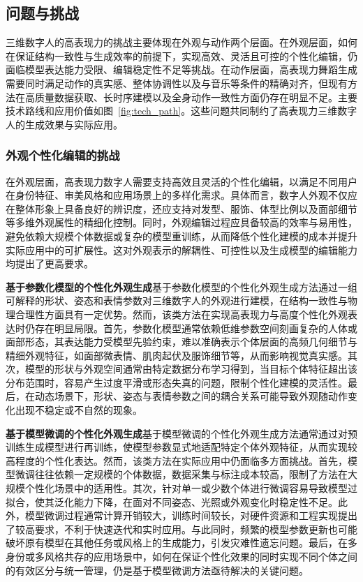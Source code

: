 \subsection{问题与挑战}

三维数字人的高表现力的挑战主要体现在外观与动作两个层面。在外观层面，如何在保证结构一致性与生成效率的前提下，实现高效、灵活且可控的个性化编辑，仍面临模型表达能力受限、编辑稳定性不足等挑战。在动作层面，高表现力舞蹈生成需要同时满足动作的真实感、整体协调性以及与音乐等条件的精确对齐，但现有方法在高质量数据获取、长时序建模以及全身动作一致性方面仍存在明显不足。主要技术路线和应用价值如图~\ref{fig:tech_path}。这些问题共同制约了高表现力三维数字人的生成效果与实际应用。


\subsubsection{外观个性化编辑的挑战} 在外观层面，高表现力数字人需要支持高效且灵活的个性化编辑，以满足不同用户在身份特征、审美风格和应用场景上的多样化需求。具体而言，数字人外观不仅应在整体形象上具备良好的辨识度，还应支持对发型、服饰、体型比例以及面部细节等多维外观属性的精细化控制。同时，外观编辑过程应具备较高的效率与易用性，避免依赖大规模个体数据或复杂的模型重训练，从而降低个性化建模的成本并提升实际应用中的可扩展性。这对外观表示的解耦性、可控性以及生成模型的编辑能力均提出了更高要求。

\noindent\textbf{基于参数化模型的个性化外观生成}\quad 基于参数化模型的个性化外观生成方法通过一组可解释的形状、姿态和表情参数对三维数字人的外观进行建模，在结构一致性与物理合理性方面具有一定优势。然而，该类方法在实现高表现力与高度个性化外观表达时仍存在明显局限。首先，参数化模型通常依赖低维参数空间刻画复杂的人体或面部形态，其表达能力受模型先验约束，难以准确表示个体层面的高频几何细节与精细外观特征，如面部微表情、肌肉起伏及服饰细节等，从而影响视觉真实感。其次，模型的形状与外观空间通常由特定数据分布学习得到，当目标个体特征超出该分布范围时，容易产生过度平滑或形态失真的问题，限制个性化建模的灵活性。最后，在动态场景下，形状、姿态与表情参数之间的耦合关系可能导致外观随动作变化出现不稳定或不自然的现象。

\noindent\textbf{基于模型微调的个性化外观生成}\quad 基于模型微调的个性化外观生成方法通常通过对预训练生成模型进行再训练，使模型参数显式地适配特定个体外观特征，从而实现较高程度的个性化表达。然而，该类方法在实际应用中仍面临多方面挑战。首先，模型微调往往依赖一定规模的个体数据，数据采集与标注成本较高，限制了方法在大规模个性化场景中的适用性。其次，针对单一或少数个体进行微调容易导致模型过拟合，使其泛化能力下降，在面对不同姿态、光照或外观变化时稳定性不足。此外，模型微调过程通常计算开销较大，训练时间较长，对硬件资源和工程实现提出了较高要求，不利于快速迭代和实时应用。与此同时，频繁的模型参数更新也可能破坏原有模型在其他任务或风格上的生成能力，引发灾难性遗忘问题。最后，在多身份或多风格共存的应用场景中，如何在保证个性化效果的同时实现不同个体之间的有效区分与统一管理，仍是基于模型微调方法亟待解决的关键问题。

